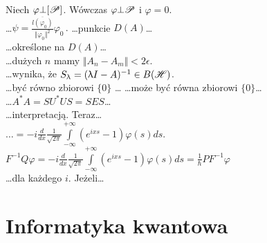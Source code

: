 \documentclass[a4paper,11pt]{article}
\numberwithin{equation}{section}
\renewcommand{\lambda}{\uplambda}
\begin{document}
\VerSpaceFour


\noindent
{} Niech $\varphi \bot [ \mathcal{P} ]$. Wówczas $\varphi \bot \mathcal{P}$ i $\varphi = 0$. \\
 \ldots$\psi =
\frac{ \overline{ l ( \varphi_{ 0 } ) } }{ \Vert \varphi_{ 0 } \Vert^{ 2 } } \varphi_{ 0 } \, .$
 \ldots punkcie $D( A )$\ldots \\
 \ldots określone na $D( A )$\ldots \\
 \ldots dużych $n$ mamy $\Vert A_{ n } - A_{ m } \Vert < 2 \epsilon$. \\
 \ldots wynika, że $S_{ \lambda } = ( \lambda I - A )^{ -1 } \in B( \Hcal )$. \\
 \ldots być równo zbiorowi $\{ 0 \}$ \ldots
{} \ldots może być równa zbiorowi $\{ 0 \}$\ldots \\
 \ldots$A^{ * } A = S U^{ * } U S = S E S$\ldots \\
 \ldots interpretacją. Teraz\ldots \\
 $\ldots = -i \frac{ d }{ dx } \frac{ 1 }{ \sqrt{ 2 \pi } }
\int\limits_{ -\infty }^{ +\infty } ( e^{ i x s } - 1 ) \varphi( s ) ds \textrm{.}$ \\
 $F^{ -1 } Q \varphi = -i \frac{ d }{ dx } \frac{ 1 }{ \sqrt{ 2 \pi } }
\int\limits_{ -\infty }^{ +\infty } ( e^{ i x s } - 1 ) \varphi( s ) d s
= \frac{ 1 }{ \hbar } P F^{ -1 } \varphi$ \\
 \ldots dla każdego $i$. Jeżeli\ldots













\newpage

\section{Informatyka kwantowa}

\VerSpaceTwo











\printbibliography






\end{document}
